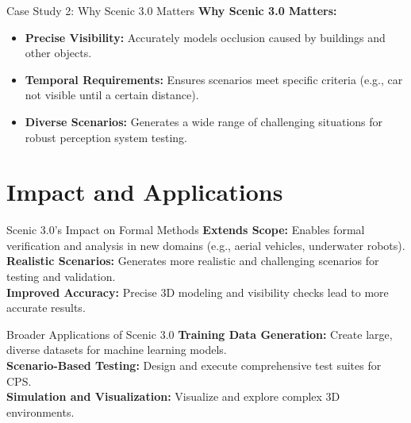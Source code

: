 \documentclass[10pt]{beamer}
\begin{document}
\begin{frame}{Case Study 2: Why Scenic 3.0 Matters}
\textbf{Why Scenic 3.0 Matters:}
\begin{itemize}
\item \textbf{Precise Visibility:} Accurately models occlusion caused by buildings and other objects.
\item \textbf{Temporal Requirements:} Ensures scenarios meet specific criteria (e.g., car not visible until a certain distance).
\item \textbf{Diverse Scenarios:} Generates a wide range of challenging situations for robust perception system testing.
\end{itemize}
\end{frame}

\section{Impact and Applications}

\begin{frame}{Scenic 3.0's Impact on Formal Methods}
    \textbf{Extends Scope:} Enables formal verification and analysis in new domains (e.g., aerial vehicles, underwater robots).\\
    \textbf{Realistic Scenarios:} Generates more realistic and challenging scenarios for testing and validation.\\
    \textbf{Improved Accuracy:} Precise 3D modeling and visibility checks lead to more accurate results.
\end{frame}

\begin{frame}{Broader Applications of Scenic 3.0}
    \textbf{Training Data Generation:} Create large, diverse datasets for machine learning models.\\
    \textbf{Scenario-Based Testing:} Design and execute comprehensive test suites for CPS.\\
    \textbf{Simulation and Visualization:} Visualize and explore complex 3D environments.
\end{frame}
\end{document}
